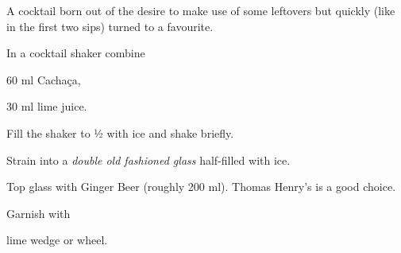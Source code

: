 \startsection[title={Gingergrass Mule},reference=gingergrassmule]
A cocktail born out of the desire to make use of some leftovers but
quickly (like in the first two sips) turned to a favourite.

\startitemize
\item In a cocktail shaker combine
      \startitemize
      \item 60 ml Cachaça,
      \item 30 ml lime juice.
      \stopitemize
\item Fill the shaker to ½ with ice and shake briefly.
\item Strain into a {\em double old fashioned glass} half-filled with ice.
\item Top glass with Ginger Beer (roughly 200 ml). Thomas Henry's is a good choice.
\item Garnish with
      \startitemize
      \item lime wedge or wheel.
      \stopitemize
\stopitemize
\stopsection
